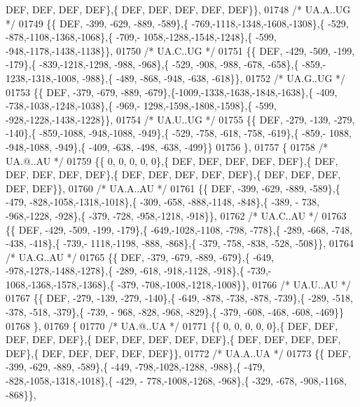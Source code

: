 \begin{DoxyCode}
      DEF,  DEF,  DEF,  DEF\},\{  DEF,  DEF,  DEF,  DEF,  DEF\}\},
01748 \textcolor{comment}{/* UA.A..UG */}
01749 \{\{  DEF, -399, -629, -889, -589\},\{ -769,-1118,-1348,-1608,-1308\},\{ -529, -878,-1108,-1368,-1068\},\{ -709,-
      1058,-1288,-1548,-1248\},\{ -599, -948,-1178,-1438,-1138\}\},
01750 \textcolor{comment}{/* UA.C..UG */}
01751 \{\{  DEF, -429, -509, -199, -179\},\{ -839,-1218,-1298, -988, -968\},\{ -529, -908, -988, -678, -658\},\{ -859,-
      1238,-1318,-1008, -988\},\{ -489, -868, -948, -638, -618\}\},
01752 \textcolor{comment}{/* UA.G..UG */}
01753 \{\{  DEF, -379, -679, -889, -679\},\{-1009,-1338,-1638,-1848,-1638\},\{ -409, -738,-1038,-1248,-1038\},\{ -969,-
      1298,-1598,-1808,-1598\},\{ -599, -928,-1228,-1438,-1228\}\},
01754 \textcolor{comment}{/* UA.U..UG */}
01755 \{\{  DEF, -279, -139, -279, -140\},\{ -859,-1088, -948,-1088, -949\},\{ -529, -758, -618, -758, -619\},\{ -859,-
      1088, -948,-1088, -949\},\{ -409, -638, -498, -638, -499\}\}
01756 \},
01757 \{
01758 \textcolor{comment}{/* UA.@..AU */}
01759 \{\{    0,    0,    0,    0,    0\},\{  DEF,  DEF,  DEF,  DEF,  DEF\},\{  DEF,  DEF,  DEF,  DEF,  DEF\},\{  DEF,  
      DEF,  DEF,  DEF,  DEF\},\{  DEF,  DEF,  DEF,  DEF,  DEF\}\},
01760 \textcolor{comment}{/* UA.A..AU */}
01761 \{\{  DEF, -399, -629, -889, -589\},\{ -479, -828,-1058,-1318,-1018\},\{ -309, -658, -888,-1148, -848\},\{ -389, -
      738, -968,-1228, -928\},\{ -379, -728, -958,-1218, -918\}\},
01762 \textcolor{comment}{/* UA.C..AU */}
01763 \{\{  DEF, -429, -509, -199, -179\},\{ -649,-1028,-1108, -798, -778\},\{ -289, -668, -748, -438, -418\},\{ -739,-
      1118,-1198, -888, -868\},\{ -379, -758, -838, -528, -508\}\},
01764 \textcolor{comment}{/* UA.G..AU */}
01765 \{\{  DEF, -379, -679, -889, -679\},\{ -649, -978,-1278,-1488,-1278\},\{ -289, -618, -918,-1128, -918\},\{ -739,-
      1068,-1368,-1578,-1368\},\{ -379, -708,-1008,-1218,-1008\}\},
01766 \textcolor{comment}{/* UA.U..AU */}
01767 \{\{  DEF, -279, -139, -279, -140\},\{ -649, -878, -738, -878, -739\},\{ -289, -518, -378, -518, -379\},\{ -739, -
      968, -828, -968, -829\},\{ -379, -608, -468, -608, -469\}\}
01768 \},
01769 \{
01770 \textcolor{comment}{/* UA.@..UA */}
01771 \{\{    0,    0,    0,    0,    0\},\{  DEF,  DEF,  DEF,  DEF,  DEF\},\{  DEF,  DEF,  DEF,  DEF,  DEF\},\{  DEF,  
      DEF,  DEF,  DEF,  DEF\},\{  DEF,  DEF,  DEF,  DEF,  DEF\}\},
01772 \textcolor{comment}{/* UA.A..UA */}
01773 \{\{  DEF, -399, -629, -889, -589\},\{ -449, -798,-1028,-1288, -988\},\{ -479, -828,-1058,-1318,-1018\},\{ -429, -
      778,-1008,-1268, -968\},\{ -329, -678, -908,-1168, -868\}\},

\end{DoxyCode}
